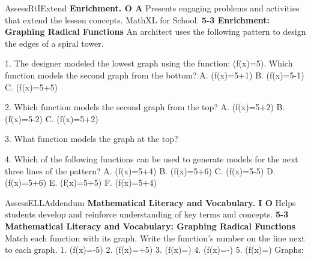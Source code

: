 \documentclass{article}
\newenvironment{te-addendum}[2]{}{}     %
\newcommand{\answer}[1]{}               %
\newcommand{\placeholder}[2]{}          %
\newcommand{\uncertain}[2]{#1}          %
\newcommand{\te}[1]{}                   %
\begin{document}
\begin{te-addendum}{Assess}{RtIExtend}
\textbf{Enrichment. O A}
Presents engaging problems and activities that extend the lesson concepts. MathXL for School.
\textbf{5-3 Enrichment: Graphing Radical Functions}
An architect uses the following pattern to design the edges of a spiral tower.
\placeholder{graph}{Four black increasing square-root arcs beginning near the origin and stacked vertically, all with right arrowheads. Axes x,y, origin O, x grid 20 with labels -80,-40,40,80, y grid 2 with labels -8,-4,4,8; window x=-100 to 100,y=-10 to 10.}
\placeholder{illustration}{Gray curved spiral tower facade with eight curved horizontal edge lines, narrowing toward its rounded top; no numerical labels.}
1. The designer modeled the lowest graph using the function: (f(x)=5). Which function models the second graph from the bottom?
A. (f(x)=5+1)
B. (f(x)=5-1)
C. (f(x)=5+5)
\answer{A}
2. Which function models the second graph from the top?
A. (f(x)=5+2)
B. (f(x)=5-2)
C. (f(x)=5+2)
\answer{A}
3. What function models the graph at the top?
\answer{(f(x)=\frac{\sqrt{6x-\uncertain{8}{81}}}5+3)}
\te{The very small printed constant reads 8; likely 81 to follow the sequence 3,29,55,81,107,133,159.}
4. Which of the following functions can be used to generate models for the next three lines of the pattern?
A. (f(x)=5+4)
B. (f(x)=5+6)
C. (f(x)=5-5)
D. (f(x)=5+6)
E. (f(x)=5+5)
F. (f(x)=5+4)
\answer{A, D, E}
\end{te-addendum}
\begin{te-addendum}{Assess}{ELLAddendum}
\textbf{Mathematical Literacy and Vocabulary. I O}
Helps students develop and reinforce understanding of key terms and concepts.
\textbf{5-3 Mathematical Literacy and Vocabulary: Graphing Radical Functions}
Match each function with its graph. Write the function's number on the line next to each graph.
1. (f(x)=-5)
2. (f(x)=+5)
3. (f(x)=)
4. (f(x)=-)
5. (f(x)=)
Graphs:
\placeholder{graph}{Five black square-root graphs labeled a,b,c,d,e, arranged a,c on first row, b,d second row, e bottom left. Axes x,y and origin O on each, grid spacing 2 on both axes. a: sqrt(5x), endpoint (0,0), right arrow; b: sqrt(-5x), endpoint (0,0), left arrow; c: -sqrt(5x), endpoint (0,0), right downward arrow; d: sqrt(5x)-5, endpoint (0,-5), right upward arrow. These four have windows -10 to 10 on both axes, labels -8,-4,4,8. e: sqrt(5x)+5, endpoint (0,5), right upward arrow, x window -10 to 10 with labels -8,-4,4,8, y window -2 to 18 with labels 4,8,12,16. No separately marked points.}
\answer{a. 3, b. 5, c. 4, d. 1, e. 2}
\end{te-addendum}
\end{document}
